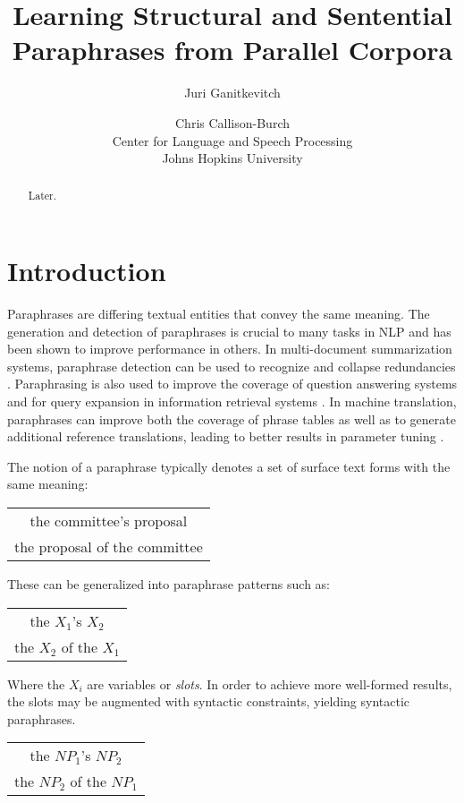 \documentclass[11pt]{article}
\title{Learning Structural and Sentential Paraphrases from Parallel Corpora}
\author{Juri Ganitkevitch \and Chris Callison-Burch\\ 
Center for Language and Speech Processing\\ 
Johns Hopkins University}
\date{}
\begin{document}
\maketitle

\begin{abstract}
Later.
\end{abstract}

\section{Introduction} \label{introduction}

Paraphrases are differing textual entities that convey the same
meaning. The generation and detection of paraphrases is crucial to
many tasks in NLP and has been shown to improve performance in
others. In multi-document summarization systems, paraphrase detection
can be used to recognize and collapse redundancies
\cite{Barzilay1999}. Paraphrasing is also used to improve the coverage
of question answering systems \cite{Ravichandran2002} and for query
expansion in information retrieval systems \cite{Anick1999}. In
machine translation, paraphrases can improve both the coverage of
phrase tables \cite{Callison-Burch2006b} as well as to generate
additional reference translations, leading to better results in
parameter tuning \cite{Madnani2007}.

The notion of a paraphrase typically denotes a set of surface text
forms with the same meaning:
\begin{center}
\begin{tabular}{c}
the committee's proposal \\
the proposal of the committee
\end{tabular}
\end{center}
These can be generalized into paraphrase patterns such as:
\begin{center}
\begin{tabular}{c}
the $X_1$'s $X_2$ \\
the $X_2$ of the $X_1$
\end{tabular}
\end{center}
Where the $X_i$ are variables or \emph{slots}. In order to achieve
more well-formed results, the slots may be augmented with syntactic
constraints, yielding syntactic paraphrases.
\begin{center}
\begin{tabular}{c}
the $NP_1$'s $NP_2$ \\
the $NP_2$ of the $NP_1$
\end{tabular}
\end{center}
\end{document}
